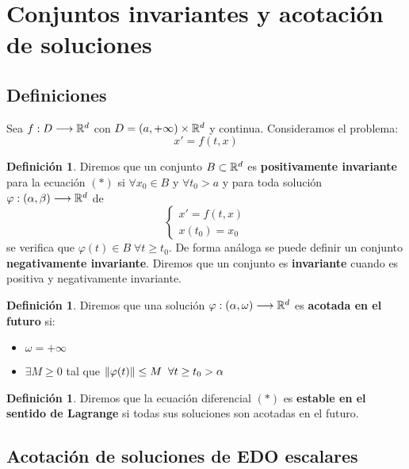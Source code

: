 \documentclass[12pt]{article}
\theoremstyle{definition}
\newtheorem{definition}[theorem]{Definición}
\theoremstyle{remark}
\begin{document}
\section{Conjuntos invariantes y acotación de soluciones}

\subsection{Definiciones}

Sea $f : D \longrightarrow \mathbb{R}^d$ con $D=(a,+\infty)\times\mathbb{R}^d$ y continua. Consideramos el problema:
\begin{equation}
x'=f(t,x) \tag{*}
\end{equation}

\begin{definition}
Diremos que un conjunto $B\subset\mathbb{R}^d$ es \textbf{positivamente invariante} para la ecuación $(*)$ si $\forall x_0\in B$ y $\forall t_0>a$ y para toda solución $\varphi : (\alpha,\beta) \longrightarrow \mathbb{R}^d$ de
\[
\left\{
\begin{array}{l}
x'=f(t,x)\\
x(t_0)=x_0
\end{array}
\right.
\]
se verifica que $\varphi(t)\in B \; \forall t \geq t_0$. De forma análoga se puede definir un conjunto \textbf{negativamente invariante}. Diremos que un conjunto es \textbf{invariante} cuando es positiva y negativamente invariante.
\end{definition}

\begin{definition}
Diremos que una solución $\varphi : (\alpha,\omega) \longrightarrow \mathbb{R}^d$ es \textbf{acotada en el futuro} si:
\begin{itemize}
\item $\omega=+\infty$
\item $\exists M \geq 0$ tal que $\left\lVert\varphi(t)\right\rVert\leq M \;\; \forall t \geq t_0 > \alpha$
\end{itemize}
\end{definition}

\begin{definition}
Diremos que la ecuación diferencial $(*)$ es \textbf{estable en el sentido de Lagrange} si todas sus soluciones son acotadas en el futuro.
\end{definition}

\subsection{Acotación de soluciones de EDO escalares}
\end{document}
